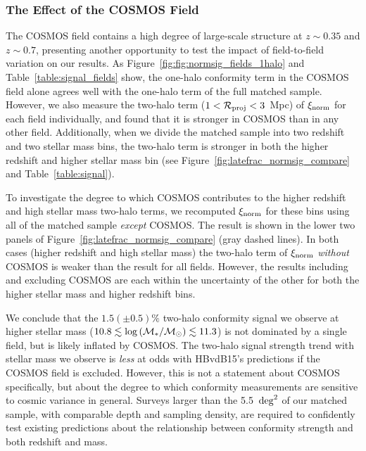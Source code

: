 
\subsubsection{The Effect of the COSMOS Field}\label{sec:cosmos}

The COSMOS field contains a high degree of large-scale structure at $z\sim0.35$ and $z\sim0.7$, presenting another opportunity to test the impact of field-to-field variation on our results.
As Figure~\ref{fig:fig:normsig_fields_1halo} and Table~\ref{table:signal_fields} show, the one-halo conformity term in the COSMOS field alone agrees well with the one-halo term of the full matched sample.
However, we also measure the two-halo term (${1<\mathcal{R}_{\text{proj}}<3}$~Mpc) of $\signorm$ for each field individually, and found that it is stronger in COSMOS than in any other field.
Additionally, when we divide the matched sample into two redshift and two stellar mass bins, the two-halo term is stronger in both the higher redshift and higher stellar mass bin (see Figure~\ref{fig:latefrac_normsig_compare} and Table~\ref{table:signal}).

To investigate the degree to which COSMOS contributes to the higher redshift and high stellar mass two-halo terms, we recomputed $\signorm$ for these bins using all of the matched sample \emph{except} COSMOS.
The result is shown in the lower two panels of Figure~\ref{fig:latefrac_normsig_compare} (gray dashed lines).
In both cases (higher redshift and high stellar mass) the two-halo term of $\signorm$ \emph{without} COSMOS is weaker than the result for all fields.
However, the results including and excluding COSMOS are each within the uncertainty of the other for both the higher stellar mass and higher redshift bins.

We conclude that the $1.5(\pm0.5)\%$ two-halo conformity signal we observe at higher stellar mass (${10.8\lesssim \logM
 \lesssim11.3}$) is not dominated by a single field, but is likely inflated by COSMOS.
The two-halo signal strength trend with stellar mass we observe is \emph{less} at odds with HBvdB15's predictions if the COSMOS field is excluded.
However, this is not a statement about COSMOS specifically, but about the degree to which conformity measurements are sensitive to cosmic variance in general.
Surveys larger than the 5.5~$\degsq$ of our matched sample, with comparable depth and sampling density, are required
to confidently test existing predictions about the relationship between conformity strength and both redshift and mass.

